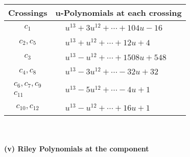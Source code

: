 \documentclass[1p]{elsarticle_modified}
\theoremstyle{definition}
\begin{document}
\begin{tabular}{m{50pt}|m{274pt}}
Crossings & \hspace{64pt}u-Polynomials at each crossing \\
\hline $$\begin{aligned}c_{1}\end{aligned}$$&$\begin{aligned}
&u^{13}+3 u^{12}+\cdots+104 u-16
\end{aligned}$\\
\hline $$\begin{aligned}c_{2},c_{5}\end{aligned}$$&$\begin{aligned}
&u^{13}+u^{12}+\cdots+12 u+4
\end{aligned}$\\
\hline $$\begin{aligned}c_{3}\end{aligned}$$&$\begin{aligned}
&u^{13}- u^{12}+\cdots+1508 u+548
\end{aligned}$\\
\hline $$\begin{aligned}c_{4},c_{8}\end{aligned}$$&$\begin{aligned}
&u^{13}-3 u^{12}+\cdots-32 u+32
\end{aligned}$\\
\hline $$\begin{aligned}c_{6},c_{7},c_{9}\\c_{11}\end{aligned}$$&$\begin{aligned}
&u^{13}-5 u^{12}+\cdots-4 u+1
\end{aligned}$\\
\hline $$\begin{aligned}c_{10},c_{12}\end{aligned}$$&$\begin{aligned}
&u^{13}- u^{12}+\cdots+16 u+1
\end{aligned}$\\
\hline
\end{tabular}\\~\\
\newpage\renewcommand{\arraystretch}{1}
\flushleft \textbf{(v) Riley Polynomials at the component}\newline \\
\end{document}
